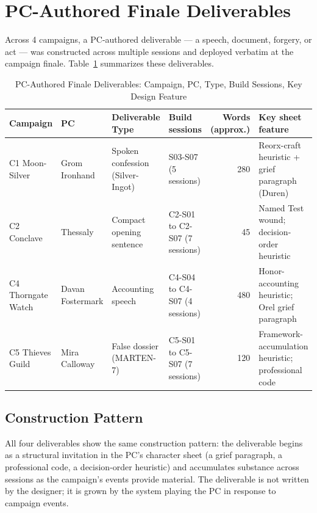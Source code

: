 
\section{PC-Authored Finale Deliverables}
\label{sec:deliverables}

Across 4 campaigns, a PC-authored deliverable --- a speech, document, forgery, or act ---
was constructed across multiple sessions and deployed verbatim at the campaign finale.
Table~\ref{tab:deliverables} summarizes these deliverables.

\begin{table}[t]
\caption{PC-Authored Finale Deliverables: Campaign, PC, Type, Build Sessions, Key Design Feature}
\label{tab:deliverables}
\begin{tabular}{@{}llllrp{3.5cm}@{}}
\toprule
Campaign & PC & Deliverable Type & Build sessions & Words (approx.) & Key sheet feature \\
\midrule
C1 Moon-Silver & Grom Ironhand & Spoken confession (Silver-Ingot) & S03-S07 (5 sessions) & 280 & Reorx-craft heuristic + grief paragraph (Duren) \\
C2 Conclave & Thessaly & Compact opening sentence & C2-S01 to C2-S07 (7 sessions) & 45 & Named Test wound; decision-order heuristic \\
C4 Thorngate Watch & Davan Fostermark & Accounting speech & C4-S04 to C4-S07 (4 sessions) & 480 & Honor-accounting heuristic; Orel grief paragraph \\
C5 Thieves Guild & Mira Calloway & False dossier (MARTEN-7) & C5-S01 to C5-S07 (7 sessions) & 120 & Framework-accumulation heuristic; professional code \\
\bottomrule
\end{tabular}
\end{table}

\subsection{Construction Pattern}

All four deliverables show the same construction pattern: the deliverable begins as a
structural invitation in the PC's character sheet (a grief paragraph, a professional
code, a decision-order heuristic) and accumulates substance across sessions as the
campaign's events provide material. The deliverable is not written by the designer;
it is grown by the system playing the PC in response to campaign events.

